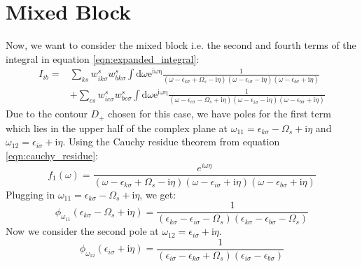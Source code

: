 \documentclass[12pt]{caltech_thesis}
\begin{document}
\section{Mixed Block}
Now, we want to consider the mixed block i.e. the second and fourth terms of the integral in equation \ref{eqn:expanded_integral}:
\begin{equation}
\begin{aligned}
I_{ib} =& \sum_{ks} w_{i k \sigma}^s w_{b k \sigma}^s \int \mathrm{d} \omega \mathrm{e}^{\mathrm{i \omega \eta}} \frac{1}{(\omega-\epsilon_{k \sigma}+\Omega_s-\mathrm{i} \eta)(\omega-\epsilon_{i \sigma}-\mathrm{i} \eta)(\omega-\epsilon_{b \sigma}+\mathrm{i} \eta)}\\
& + \sum_{cs} w_{i c \sigma}^s w_{b c \sigma}^s \int \mathrm{d} \omega \mathrm{e}^{\mathrm{i \omega \eta}} \frac{1}{(\omega-\epsilon_{c \sigma}-\Omega_s+\mathrm{i} \eta)(\omega-\epsilon_{i \sigma}-\mathrm{i} \eta)(\omega-\epsilon_{b \sigma}+\mathrm{i} \eta)}
\end{aligned}
\end{equation}
Due to the contour $D_+$ chosen for this case, we have poles for the first term which lies in the upper half of the complex plane at $\omega_{11} = \epsilon _{k \sigma } - \Omega_s + \mathrm{i} \eta$ and $\omega_{12} = \epsilon _{i \sigma } + \mathrm{i} \eta$.
Using the Cauchy residue theorem from equation \ref{eqn:cauchy_residue}:
\begin{equation}
f_1(\omega) = \frac{e^{i\omega \eta }}{(\omega-\epsilon_{k \sigma}+\Omega_s-\mathrm{i} \eta)(\omega-\epsilon_{i \sigma}+\mathrm{i} \eta)(\omega-\epsilon_{b \sigma}+\mathrm{i} \eta)}
\end{equation}
Plugging in $\omega_{11} = \epsilon _{k \sigma } - \Omega_s + \mathrm{i} \eta$, we get:
\begin{equation}
\phi_{\omega_{11}}(\epsilon_{k \sigma } - \Omega_s + \mathrm{i} \eta) = \frac{1}{(\epsilon_{k \sigma} -\epsilon_{i \sigma}-\Omega_s)(\epsilon_{k \sigma} -\epsilon_{b \sigma}-\Omega_s)}
\end{equation}
Now we consider the second pole at $\omega_{12} = \epsilon _{i \sigma } + \mathrm{i} \eta$.
\begin{equation}
\phi_{\omega_{12}}(\epsilon_{i \sigma} + \mathrm{i} \eta) = \frac{1}{(\epsilon_{i \sigma} -\epsilon_{k \sigma}+\Omega_s)(\epsilon_{i \sigma} -\epsilon_{b \sigma})}
\end{equation}
\end{document}
